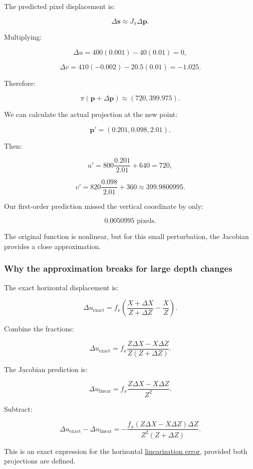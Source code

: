 The predicted pixel displacement is:

\[
\Delta\mathbf s \approx J_\pi\Delta\mathbf p.
\]

Multiplying:

\[
\Delta u =400(0.001)-40(0.01)=0,
\]

\[
\Delta v =410(-0.002)-20.5(0.01)=-1.025.
\]

Therefore:

\[
\boxed{ \pi(\mathbf p+\Delta\mathbf p) \approx(720,399.975) }.
\]

We can calculate the actual projection at the new point:

\[
\mathbf p'=(0.201,0.098,2.01).
\]

Then:

\[
u'=800\frac{0.201}{2.01}+640=720,
\]

\[
v'=820\frac{0.098}{2.01}+360 \approx399.9800995.
\]

Our first-order prediction missed the vertical coordinate by only:

\[
\boxed{0.0050995\text{ pixels}}.
\]

The original function is nonlinear, but for this small perturbation, the Jacobian provides a close approximation.

\subsubsection{Why the approximation breaks for large depth changes}\label{02-foundations-ii-ch021-why-the-approximation-breaks-for-large-depth-changes}

The exact horizontal displacement is:

\[
\Delta u_{\text{exact}} = f_x\left( \frac{X+\Delta X}{Z+\Delta Z} -\frac XZ \right).
\]

Combine the fractions:

\[
\Delta u_{\text{exact}} = f_x\frac{Z\Delta X-X\Delta Z}{Z(Z+\Delta Z)}.
\]

The Jacobian prediction is:

\[
\Delta u_{\text{linear}} = f_x\frac{Z\Delta X-X\Delta Z}{Z^2}.
\]

Subtract:

\[
\boxed{ \Delta u_{\text{exact}}-\Delta u_{\text{linear}} = -\frac{f_x(Z\Delta X-X\Delta Z)\Delta Z} {Z^2(Z+\Delta Z)} }.
\]

This is an exact expression for the horizontal \hyperref[02-foundations-ii-ch021-jacobians-curvature-and-local-approximation]{linearization error}, provided both projections are defined.

